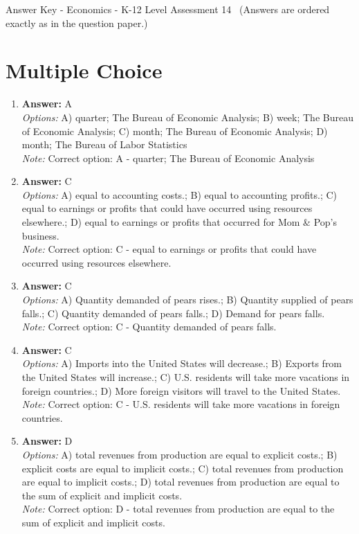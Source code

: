 \documentclass[12pt]{article}
\begin{document}
\begin{center}
Answer Key - Economics - K-12 Level Assessment 14 \
\small (Answers are ordered exactly as in the question paper.)
\end{center}

\section*{Multiple Choice}
\begin{enumerate}[label=\arabic*.]
\item \textbf{Answer:} A
\\ \textit{Options:} A) quarter; The Bureau of Economic Analysis; B) week; The Bureau of Economic Analysis; C) month; The Bureau of Economic Analysis; D) month; The Bureau of Labor Statistics
\\ \textit{Note:} Correct option: A - quarter; The Bureau of Economic Analysis
\item \textbf{Answer:} C
\\ \textit{Options:} A) equal to accounting costs.; B) equal to accounting profits.; C) equal to earnings or profits that could have occurred using resources elsewhere.; D) equal to earnings or profits that occurred for Mom \& Pop's business.
\\ \textit{Note:} Correct option: C - equal to earnings or profits that could have occurred using resources elsewhere.
\item \textbf{Answer:} C
\\ \textit{Options:} A) Quantity demanded of pears rises.; B) Quantity supplied of pears falls.; C) Quantity demanded of pears falls.; D) Demand for pears falls.
\\ \textit{Note:} Correct option: C - Quantity demanded of pears falls.
\item \textbf{Answer:} C
\\ \textit{Options:} A) Imports into the United States will decrease.; B) Exports from the United States will increase.; C) U.S. residents will take more vacations in foreign countries.; D) More foreign visitors will travel to the United States.
\\ \textit{Note:} Correct option: C - U.S. residents will take more vacations in foreign countries.
\item \textbf{Answer:} D
\\ \textit{Options:} A) total revenues from production are equal to explicit costs.; B) explicit costs are equal to implicit costs.; C) total revenues from production are equal to implicit costs.; D) total revenues from production are equal to the sum of explicit and implicit costs.
\\ \textit{Note:} Correct option: D - total revenues from production are equal to the sum of explicit and implicit costs.
\end{enumerate}
\end{document}
